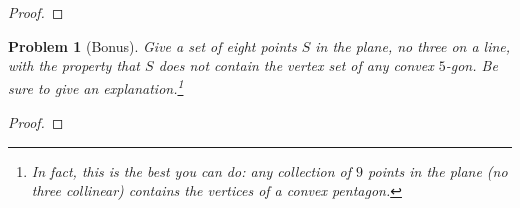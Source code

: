 \documentclass[11pt]{article}
\newtheorem{problem}{Problem}
\begin{document}
\begin{proof}

\end{proof}

\pagebreak 

\begin{problem}[Bonus]
Give a set of eight points $S$ in the plane, no three on a line, with the property that $S$ does not contain the vertex set of any convex $5$-gon. Be sure to give an explanation.\footnote{In fact, this is the best you can do: any collection of $9$ points in the plane (no three collinear) contains the vertices of a convex pentagon.} 
\end{problem}

\begin{proof}

\end{proof}
\end{document}
